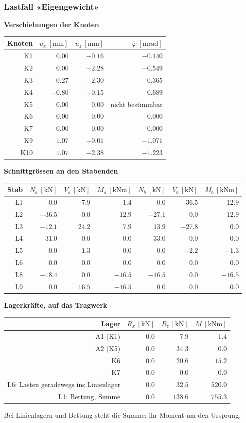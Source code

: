 \documentclass[11pt,a4paper]{article}
\begin{document}
\subsubsection{Lastfall «Eigengewicht»}
\noindent\textbf{Verschiebungen der Knoten}
\begin{longtable}{rrrr}
\hline
Knoten & $u_x\ [\mathrm{mm}]$ & $u_z\ [\mathrm{mm}]$ & $\varphi\ [\mathrm{mrad}]$ \\
\hline
\endhead
K1 & $0.00$ & $-0.16$ & $-0.140$ \\
K2 & $0.00$ & $-2.28$ & $-0.549$ \\
K3 & $0.27$ & $-2.30$ & $0.365$ \\
K4 & $-0.80$ & $-0.15$ & $0.689$ \\
K5 & $0.00$ & $0.00$ & nicht bestimmbar \\
K6 & $0.00$ & $0.00$ & $0.000$ \\
K7 & $0.00$ & $0.00$ & $0.000$ \\
K9 & $1.07$ & $-0.01$ & $-1.071$ \\
K10 & $1.07$ & $-2.38$ & $-1.223$ \\
\hline
\end{longtable}
\noindent\textbf{Schnittgrössen an den Stabenden}
\begin{longtable}{rrrrrrr}
\hline
Stab & $N_{a}\ [\mathrm{kN}]$ & $V_{a}\ [\mathrm{kN}]$ & $M_{a}\ [\mathrm{kNm}]$ & $N_{b}\ [\mathrm{kN}]$ & $V_{b}\ [\mathrm{kN}]$ & $M_{b}\ [\mathrm{kNm}]$ \\
\hline
\endhead
L1 & $0.0$ & $7.9$ & $-1.4$ & $0.0$ & $36.5$ & $12.9$ \\
L2 & $-36.5$ & $0.0$ & $12.9$ & $-27.1$ & $0.0$ & $12.9$ \\
L3 & $-12.1$ & $24.2$ & $7.9$ & $13.9$ & $-27.8$ & $0.0$ \\
L4 & $-31.0$ & $0.0$ & $0.0$ & $-33.0$ & $0.0$ & $0.0$ \\
L5 & $0.0$ & $1.3$ & $0.0$ & $0.0$ & $-2.2$ & $-1.3$ \\
L6 & $0.0$ & $0.0$ & $0.0$ & $0.0$ & $0.0$ & $0.0$ \\
L8 & $-18.4$ & $0.0$ & $-16.5$ & $-16.5$ & $0.0$ & $-16.5$ \\
L9 & $0.0$ & $16.5$ & $-16.5$ & $0.0$ & $0.0$ & $0.0$ \\
\hline
\end{longtable}
\noindent\textbf{Lagerkräfte, auf das Tragwerk}
\begin{longtable}{rrrr}
\hline
Lager & $R_x\ [\mathrm{kN}]$ & $R_z\ [\mathrm{kN}]$ & $M\ [\mathrm{kNm}]$ \\
\hline
\endhead
A1 (K1) & $0.0$ & $7.9$ & $1.4$ \\
A2 (K5) & $0.0$ & $34.3$ & $0.0$ \\
K6 & $0.0$ & $20.6$ & $15.2$ \\
K7 & $0.0$ & $0.0$ & $0.0$ \\
L6: Lasten geradewegs ins Linienlager & $0.0$ & $32.5$ & $520.0$ \\
L1: Bettung, Summe & $0.0$ & $138.6$ & $755.3$ \\
\hline
\end{longtable}
Bei Linienlagern und Bettung steht die Summe; ihr Moment um den Ursprung.
\end{document}
